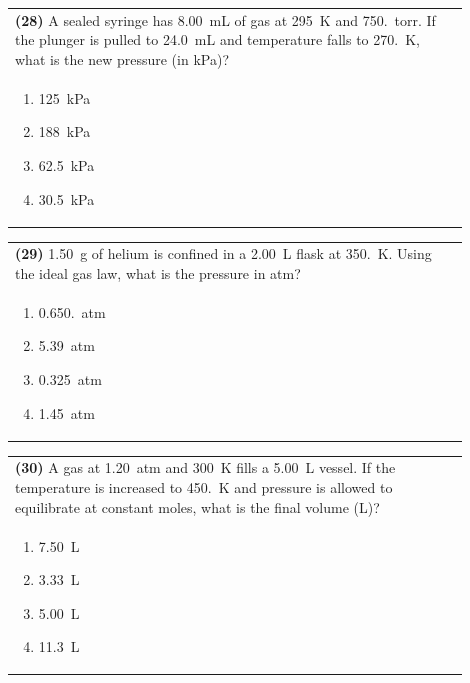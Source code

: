 \documentclass{article}
\begin{document}
{{\vspace{0.2cm}
\noindent\begin{tabular}{|p{0.9\linewidth}|}
\hline
\textbf{(28)} A sealed syringe has 8.00~mL of gas at 295~K and 750.~torr. If the plunger is pulled to 24.0~mL and temperature falls to 270.~K, what is the new pressure (in kPa)?\\[0.2cm]

\begin{minipage}[t]{0.85\linewidth}
\begin{enumerate}[label=\alph*.]
\item 125~kPa
\item 188~kPa
\item 62.5~kPa
\item 30.5~kPa
\end{enumerate}
\end{minipage}\\[0.2cm]
\hline
\end{tabular}

\newpage

\noindent\begin{tabular}{|p{0.9\linewidth}|}
\hline
\textbf{(29)} 1.50~g of helium is confined in a 2.00~L flask at 350.~K. Using the ideal gas law, what is the pressure in atm? \\[0.2cm]

\begin{minipage}[t]{0.85\linewidth}
\begin{enumerate}[label=\alph*.]
\item 0.650.~atm
\item 5.39~atm
\item 0.325~atm
\item 1.45~atm
\end{enumerate}
\end{minipage}\\[0.2cm]
\hline
\end{tabular}

\vspace{0.2cm}
\noindent\begin{tabular}{|p{0.9\linewidth}|}
\hline
\textbf{(30)} A gas at 1.20~atm and 300~K fills a 5.00~L vessel. If the temperature is increased to 450.~K and pressure is allowed to equilibrate at constant moles, what is the final volume (L)?\\[0.2cm]

\begin{minipage}[t]{0.85\linewidth}
\begin{enumerate}[label=\alph*.]
\item 7.50~L
\item 3.33~L
\item 5.00~L
\item 11.3~L
\end{enumerate}
\end{minipage}\\[0.2cm]
\hline
\end{tabular}

}}
\end{document}
